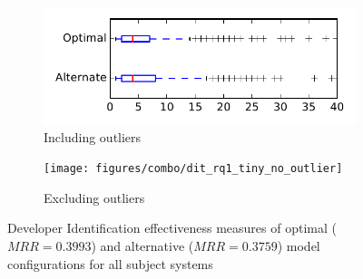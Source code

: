 
\begin{figure}
    \centering
    \begin{subfigure}{.4\textwidth}
        \centering
        \includegraphics[height=0.4\textheight]{figures/combo/dit_rq1_tiny}
        \caption{Including outliers}\label{fig:combo:dit:rq1:tiny_outlier}
    \end{subfigure}%
    \begin{subfigure}{.4\textwidth}
        \centering
        \texttt{[image: figures/combo/dit\_rq1\_tiny\_no\_outlier]}
        \caption{Excluding outliers}\label{fig:combo:dit:rq1:tiny_no_outlier}
    \end{subfigure}
\caption{Developer Identification effectiveness measures of optimal ($MRR=0.3993$) and alternative ($MRR=0.3759$) model configurations for all subject systems}
\label{fig:combo:dit:rq1:tiny}
\end{figure}
